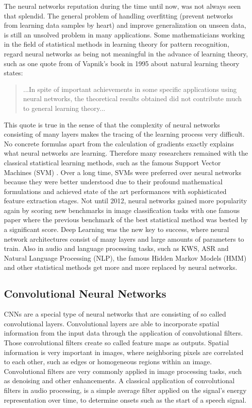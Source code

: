 The neural networks reputation during the time until now, was not always seen that splendid.
The general problem of handling overfitting (prevent networks from learning data samples by heart) and improve generalization on unseen data, is still an unsolved problem in many applications.
Some mathematicians working in the field of statistical methods in learning theory for pattern recognition, regard neural networks as being not meaningful in the advance of learning theory, such as one quote from \cite{Vapnik1995} of Vapnik's book in 1995 about natural learning theory states:
\begin{quote}
...In spite of important achievements in some specific applications using neural networks, the theoretical results obtained did not contribute much to general learning theory...
\end{quote}
This quote is true in the sense of that the complexity of neural networks consisting of many layers makes the tracing of the learning process very difficult.
No concrete formulas apart from the calculation of gradients exactly explains what neural networks are learning.
Therefore many researchers remained with the classical statistical learning methods, such as the famous Support Vector Machines (SVM) \cite{Cortes1995}.
Over a long time, SVMs were preferred over neural networks because they were better understood due to their profound mathematical formulations and achieved state of the art performances with sophisticated feature extraction stages.
Not until 2012, neural networks gained more popularity again by scoring new benchmarks in image classification tasks with one famous paper \cite{Krizhevsky2012} where the previous benchmark of the best statistical method was bested by a significant score.
Deep Learning was the new key to success, where neural network architectures consist of many layers and large amounts of parameters to train.
Also in audio and language processing tasks, such as KWS, ASR and Natural Language Processing (NLP), the famous Hidden Markov Models (HMM) and other statistical methods get more and more replaced by neural networks.



\subsection{Convolutional Neural Networks}\label{sec:prev_nn_cnn}
CNNs are a special type of neural networks that are consisting of so called convolutional layers.
Convolutional layers are able to incorporate spatial information from the input data through the application of convolutional filters.
Those convolutional filters create so called feature maps as outputs.
Spatial information is very important in images, where neighboring pixels are correlated to each other, such as edges or homogeneous regions within an image.
Convolutional filters are very commonly applied in image processing tasks, such as denoising and other enhancements.
A classical application of convolutional filters in audio processing, is a simple average filter applied on the signal's energy representation over time, to determine onsets such as the start of a speech signal.

